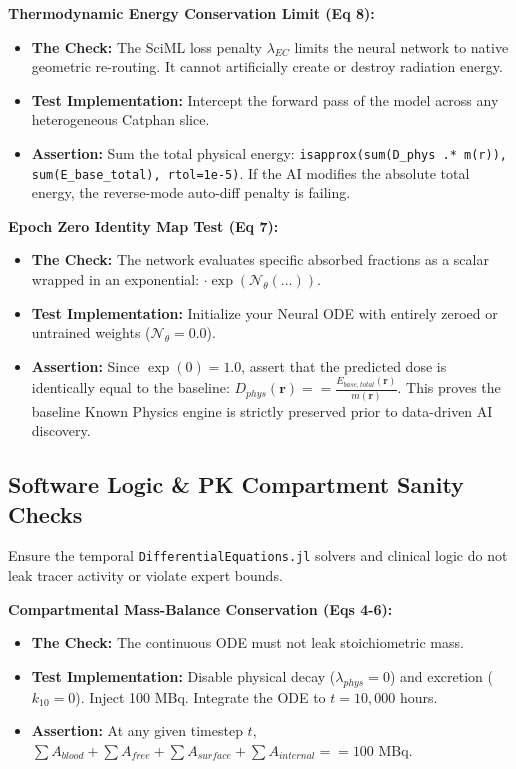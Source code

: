 \documentclass[11pt,a4paper]{article}
\begin{document}
\noindent\textbf{Thermodynamic Energy Conservation Limit (Eq 8):}
\begin{itemize}
    \item \textbf{The Check:} The SciML loss penalty $\lambda_{EC}$ limits the neural network to native geometric re-routing. It cannot artificially create or destroy radiation energy.
    \item \textbf{Test Implementation:} Intercept the forward pass of the model across any heterogeneous Catphan slice.
    \item \textbf{Assertion:} Sum the total physical energy: \texttt{isapprox(sum(D\_phys .* m(r)), sum(E\_base\_total), rtol=1e-5)}. If the AI modifies the absolute total energy, the reverse-mode auto-diff penalty is failing.
\end{itemize}

\noindent\textbf{Epoch Zero Identity Map Test (Eq 7):}
\begin{itemize}
    \item \textbf{The Check:} The network evaluates specific absorbed fractions as a scalar wrapped in an exponential: $\cdot \exp(\mathcal{N}_\theta(\dots))$.
    \item \textbf{Test Implementation:} Initialize your Neural ODE with entirely zeroed or untrained weights ($\mathcal{N}_\theta = 0.0$).
    \item \textbf{Assertion:} Since $\exp(0) = 1.0$, assert that the predicted dose is identically equal to the baseline: $D_{phys}(\mathbf{r}) == \frac{E_{base,total}(\mathbf{r})}{m(\mathbf{r})}$. This proves the baseline Known Physics engine is strictly preserved prior to data-driven AI discovery.
\end{itemize}

\subsection{Software Logic \& PK Compartment Sanity Checks}
Ensure the temporal \texttt{DifferentialEquations.jl} solvers and clinical logic do not leak tracer activity or violate expert bounds.

\noindent\textbf{Compartmental Mass-Balance Conservation (Eqs 4-6):}
\begin{itemize}
    \item \textbf{The Check:} The continuous ODE must not leak stoichiometric mass.
    \item \textbf{Test Implementation:} Disable physical decay ($\lambda_{phys} = 0$) and excretion ($k_{10} = 0$). Inject 100 MBq. Integrate the ODE to $t = 10,000$ hours.
    \item \textbf{Assertion:} At any given timestep $t$, $\sum A_{blood} + \sum A_{free} + \sum A_{surface} + \sum A_{internal} == 100 \text{ MBq}$.
\end{itemize}
\end{document}
